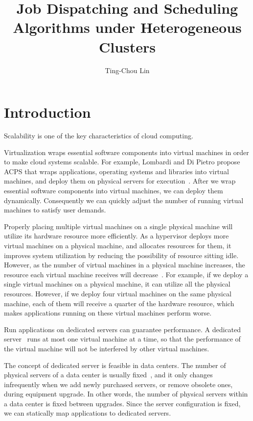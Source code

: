 \documentclass[11pt]{article}
\title{Job Dispatching and Scheduling Algorithms under Heterogeneous
  Clusters}
\author{Ting-Chou Lin}
\date{}
\begin{document}
\maketitle

\section{Introduction}

Scalability is one of the key characteristics of cloud computing.

Virtualization wraps essential software components into virtual machines
in order to make cloud systems scalable.  For example, Lombardi and Di
Pietro propose ACPS
that wraps applications, operating systems and libraries into virtual
machines, and deploy them on physical servers for
execution~\cite{secure_virt_for_cloud, cloud_issue}.  After we wrap
essential software components into virtual machines, we can deploy them
dynamically.  Consequently we can quickly adjust the number of running
virtual machines to satisfy user demands.

Properly placing multiple virtual machines on a single physical machine
will utilize its hardware resource more efficiently.  As a hypervisor
deploys more virtual machines on a physical machine, and allocates
resources for them, it improves system utilization by reducing the
possibility of resource sitting idle.  However, as the number of virtual
machines in a physical machine increases, the resource each virtual
machine receives will decrease~\cite{resource_overbooking}.  For
example, if we deploy a single virtual machines on a physical machine,
it can utilize all the physical resources.  However, if we deploy four
virtual machines on the same physical machine, each of them will receive
a quarter of the hardware resource, which makes applications running on
these virtual machines perform worse.

Run applications on dedicated servers can guarantee performance.  A
dedicated server~\cite{dedicated_hosting} runs at most one virtual
machine at a time, so that the performance of the virtual machine will
not be interfered by other virtual machines.

The concept of dedicated server is feasible in data centers.  The
number of physical servers of a data center is usually
fixed~\cite{maintenance_framework}, and it only changes infrequently
when we add newly purchased servers, or remove obsolete ones, during
equipment upgrade.  In other words, the number of physical servers
within a data center is fixed between upgrades.  Since the server
configuration is fixed, we can statically map applications to
dedicated servers.
\end{document}
